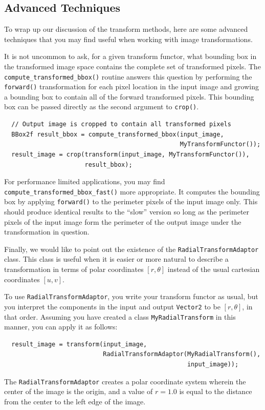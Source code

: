 \subsection{Advanced Techniques}
\label{sec:transform-advanced-techniques}

To wrap up our discussion of the transform methods, here are some
advanced techniques that you may find useful when working with image
transformations.

It is not uncommon to ask, for a given transform functor, what
bounding box in the transformed image space contains the complete set
of transformed pixels.  The \verb#compute_transformed_bbox()# routine
answers this question by performing the \verb#forward()#
transformation for each pixel location in the input image and growing
a bounding box to contain all of the forward transformed pixels.  This
bounding box can be passed directly as the second argument to
\verb#crop()#.

\begin{verbatim} 
  // Output image is cropped to contain all transformed pixels
  BBox2f result_bbox = compute_transformed_bbox(input_image, 
                                                MyTransformFunctor());
  result_image = crop(transform(input_image, MyTransformFunctor()),
                      result_bbox);
\end{verbatim}

For performance limited applications, you may find
\verb#compute_transformed_bbox_fast()# more appropriate.  It computes
the bounding box by applying \verb#forward()# to the perimeter pixels
of the input image only.  This should produce identical results to the
``slow'' version so long as the perimeter pixels of the input
image form the perimeter of the output image under the transformation
in question.

Finally, we would like to point out the existence of the
\verb#RadialTransformAdaptor# class.  This class is useful when it is
easier or more natural to describe a transformation in terms of polar
coordinates $[r,\theta]$ instead of the usual cartesian coordinates
$[u, v]$.

To use \verb#RadialTransformAdaptor#, you write your transform functor
as usual, but you interpret the components in the input and output
\verb#Vector2# to be $[r,\theta]$, in that order.  Assuming you have
created a class \verb#MyRadialTransform# in this manner, you can apply
it as follows:

\begin{verbatim} 
  result_image = transform(input_image, 
                           RadialTransformAdaptor(MyRadialTransform(),
                                                  input_image));
\end{verbatim}

The \verb#RadialTransformAdaptor# creates a polar coordinate system
wherein the center of the image is the origin, and a value of $r=1.0$ is
equal to the distance from the center to the left edge of the image.


